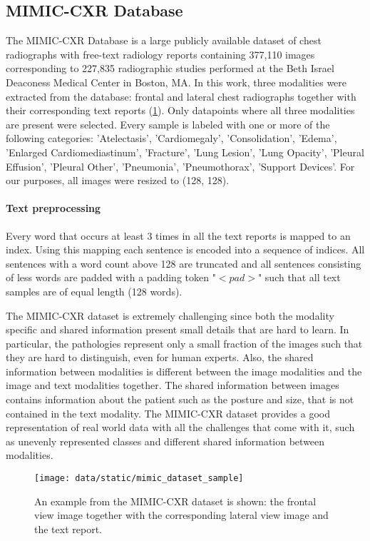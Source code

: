 \subsection{MIMIC-CXR Database}
The MIMIC-CXR Database \cite{johnson2019mimic} is a large publicly available dataset of chest radiographs with free-text radiology reports containing 377,110 images corresponding to 227,835 radiographic studies performed at the Beth Israel Deaconess Medical Center in Boston, MA.
In this work, three modalities were extracted from the database: frontal and lateral chest radiographs together with their corresponding text reports (\cref{fig:mimic}).
Only datapoints where all three modalities are present were selected.
Every sample is labeled with one or more of the following categories: 'Atelectasis', 'Cardiomegaly', 'Consolidation', 'Edema', 'Enlarged Cardiomediastinum', 'Fracture', 'Lung Lesion', 'Lung Opacity', 'Pleural Effusion', 'Pleural Other', 'Pneumonia', 'Pneumothorax', 'Support Devices'.
For our purposes, all images were resized to (128, 128).

\paragraph{Text preprocessing}
Every word that occurs at least 3 times in all the text reports is mapped to an index.
Using this mapping each sentence is encoded into a sequence of indices.
All sentences with a word count above 128 are truncated and all sentences consisting of less words are padded with a padding token "$<pad>$" such that all text samples are of equal length (128 words).

The MIMIC-CXR dataset is extremely challenging since both the modality specific and shared information present small details that are hard to learn.
In particular, the pathologies represent only a small fraction of the images such that they are hard to distinguish, even for human experts.
Also, the shared information between modalities is different between the image modalities and the image and text modalities together.
The shared information between images contains information about the patient such as the posture and size, that is not contained in the text modality.
The MIMIC-CXR dataset provides a good representation of real world data with all the challenges that come with it, such as unevenly represented classes and different shared information between modalities.


\begin{figure}[h!]
    \centering
    \texttt{[image: data/static/mimic\_dataset\_sample]}
    \vspace{-1cm}
    \caption{An example from the MIMIC-CXR dataset is shown: the frontal view image together with the corresponding lateral view image and the text report.}
    \label{fig:mimic}
\end{figure}

